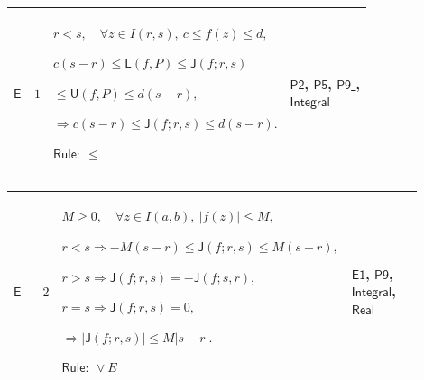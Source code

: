 \documentclass[12pt,reqno]{amsart}
\theoremstyle{blueplain}
\numberwithin{equation}{section}
\newlength{\FTCOneColumnBody}
\begin{document}
{\scriptsize \setlength{\parskip}{0pt}\nointerlineskip
\noindent 
\begin{tabular}{|@{}>{\centering\arraybackslash}m{\FTCOneColumnBody}|}
\hline
$\displaystyle \mathsf{Context\_E}:=$\par$\displaystyle \mathsf{H1}%
(f;a,b),\quad r,s,t,x,y\in I(a,b).$ \\ \hline
\end{tabular}%
}

{\scriptsize \setlength{\parskip}{0pt}\nointerlineskip
\noindent 
\begin{tabular}{|@{}>{\centering\arraybackslash}m{0.10658\linewidth}|>{\centering\arraybackslash}m{0.03553\linewidth}|>{\centering\arraybackslash}m{0.52105\linewidth}|>{\centering\arraybackslash}m{0.23684\linewidth}|}
\hline
\hypertarget{proof:E1}{$\displaystyle \mathsf{E}$} & $\displaystyle 1$ & $%
\displaystyle r<s,\quad\forall z\in I(r,s),\ c\le f(z)\le d,$\par$%
\displaystyle c(s-r)\le\mathsf{L}(f,P)\le\mathsf{J}(f;r,s)$\par$%
\displaystyle {}\le\mathsf{U}(f,P)\le d(s-r),$\par$\displaystyle \Rightarrow
c(s-r)\le\mathsf{J}(f;r,s)\le d(s-r).$\par$\displaystyle \mathsf{Rule}:\ \le$
& \hyperlink{proof:P2}{$\displaystyle \mathsf{P2}$}, \hyperlink{proof:P5}{$%
\displaystyle \mathsf{P5}$}, \hyperlink{proof:P9}{$\displaystyle \mathsf{P9}$%
}, \hyperlink{def:Integral}{$\displaystyle \mathsf{Integral}$} \\ \hline
\end{tabular}%
}

{\scriptsize \setlength{\parskip}{0pt}\nointerlineskip
\noindent 
\begin{tabular}{|@{}>{\centering\arraybackslash}m{0.10658\linewidth}|>{\centering\arraybackslash}m{0.03553\linewidth}|>{\centering\arraybackslash}m{0.52105\linewidth}|>{\centering\arraybackslash}m{0.23684\linewidth}|}
\hline
\hypertarget{proof:E2}{$\displaystyle \mathsf{E}$} & $\displaystyle 2$ & $%
\displaystyle M\ge0,\quad\forall z\in I(a,b),\ |f(z)|\le M,$\par$%
\displaystyle r<s\Rightarrow-M(s-r)\le\mathsf{J}(f;r,s)\le M(s-r),$\par$%
\displaystyle r>s\Rightarrow\mathsf{J}(f;r,s)=-\mathsf{J}(f;s,r),$\par$%
\displaystyle r=s\Rightarrow\mathsf{J}(f;r,s)=0,$\par$\displaystyle %
\Rightarrow|\mathsf{J}(f;r,s)|\le M|s-r|.$\par$\displaystyle \mathsf{Rule}:\
\lor E$ & \hyperlink{proof:E1}{$\displaystyle \mathsf{E1}$}, \hyperlink{proof:P9}%
{$\displaystyle \mathsf{P9}$}, \hyperlink{def:Integral}{$\displaystyle 
\mathsf{Integral}$}, \hyperlink{ax:Real}{$\displaystyle \mathsf{Real}$} \\ 
\hline
\end{tabular}%
}
\end{document}
